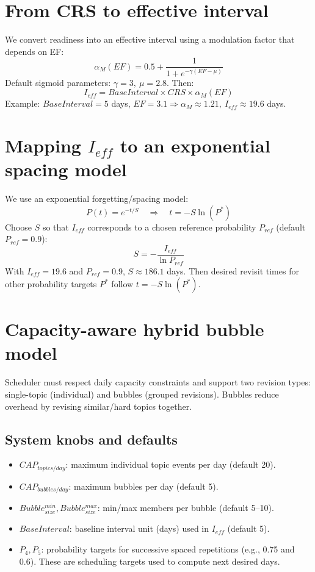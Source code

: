 \documentclass[11pt]{article}
\begin{document}
\section{From CRS to effective interval}
We convert readiness into an effective interval using a modulation factor that depends on EF:
\[
\alpha_M(EF) = 0.5 + \frac{1}{1+e^{-\gamma (EF-\mu)}}
\]
Default sigmoid parameters: $\gamma=3,\ \mu=2.8$. Then:
\[
I_{eff} = BaseInterval \times CRS \times \alpha_M(EF)
\]
Example: $BaseInterval=5$ days, $EF=3.1 \Rightarrow \alpha_M\approx1.21,\ I_{eff}\approx19.6$ days.

\section{Mapping $I_{eff}$ to an exponential spacing model}
We use an exponential forgetting/spacing model:
\[
P(t)=e^{-t/S}\quad\Rightarrow\quad t=-S\ln(P^*)
\]
Choose $S$ so that $I_{eff}$ corresponds to a chosen reference probability $P_{ref}$ (default $P_{ref}=0.9$):
\[
S = -\frac{I_{eff}}{\ln P_{ref}}
\]
With $I_{eff}=19.6$ and $P_{ref}=0.9$, $S\approx186.1$ days. Then desired revisit times for other probability targets $P^*$ follow $t=-S\ln(P^*)$.

\section{Capacity-aware hybrid bubble model}
Scheduler must respect daily capacity constraints and support two revision types: single-topic (individual) and bubbles (grouped revisions). Bubbles reduce overhead by revising similar/hard topics together.

\subsection{System knobs and defaults}\label{sec:params}
\begin{itemize}
  \item $CAP_{topics/day}$: maximum individual topic events per day (default 20).
  \item $CAP_{bubbles/day}$: maximum bubbles per day (default 5).
  \item $Bubble_{size}^{min},Bubble_{size}^{max}$: min/max members per bubble (default 5--10).
  \item $BaseInterval$: baseline interval unit (days) used in $I_{eff}$ (default 5).
  \item $P_{4},P_{5}$: probability targets for successive spaced repetitions (e.g., 0.75 and 0.6). These are scheduling targets used to compute next desired days.
\end{itemize}
\end{document}
